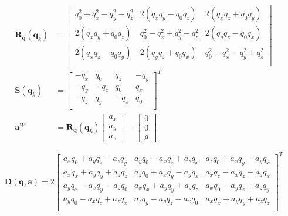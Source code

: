 \begin{align}
	\bm{R_q} \left( \bm{q}_k \right) &=  \begin{bmatrix}
		q_0^2 + q_x^2 - q_y^2 - q_z^2 & 2(q_x q_y - q_0 q_z) & 2(q_x q_z + q_0 q_y) \\
		2(q_x q_y + q_0 q_z) & q_0^2 - q_x^2 + q_y^2 - q_z^2 & 2(q_y q_z - q_0 q_x) \\
		2(q_x q_z - q_0 q_y) & 2(q_y q_z + q_0 q_x) & q_0^2 - q_x^2 - q_y^2 + q_z^2 \\
	\end{bmatrix}
	\\
	\bm{S} \left( \bm{q}_k \right)  &= \begin{bmatrix}
		-q_x & q_0 & q_z & -q_y \\
		-q_y & -q_z & q_0 & q_x \\
		-q_z & q_y & -q_x & q_0 \\
	\end{bmatrix}^T
	\\
	\bm{a}^W &= \bm{R_q} \left( \bm{q}_k \right) \begin{bmatrix}
		a_x \\ a_y \\ a_z 
	\end{bmatrix} - \begin{bmatrix}
		0 \\ 0 \\ g 
	\end{bmatrix}
	\label{state_end}
\end{align}



\begin{equation}
	\bm{D} \left( \bm{q}, \bm{a}\right)
	=
	2
	\begin{bmatrix}
		a_xq_0 + a_yq_z - a_zq_y & a_yq_0 - a_xq_z + a_zq_x & a_zq_0 + a_xq_y - a_yq_x \\
		a_xq_x + a_yq_y + a_zq_z & a_zq_0 + a_xq_y - a_yq_x & a_xq_z - a_xq_z - a_zq_x \\
		a_yq_x - a_xq_y - a_zq_0 & a_xq_x + a_yq_y + a_zq_z & a_xq_0 - a_yq_z + a_zq_y \\
		a_yq_0 - a_xq_z + a_zq_x & a_zq_y - a_yq_z - a_xq_0 & a_xq_x + a_yq_y + a_zq_z \\
	\end{bmatrix}^T
	\label{state_jacobi_begin}
\end{equation}

